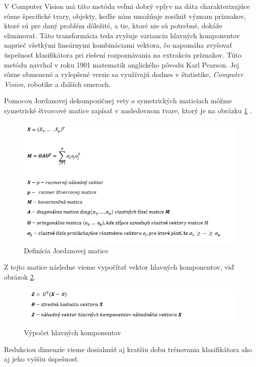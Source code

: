 V Computer Vision má táto metóda veľmi dobrý vplyv na dáta charakterizujúce rôzne špecifické tvary, objekty, keďže nám umožňuje zosilniť význam príznakov, ktoré sú pre daný problém dôležité, a tie, ktoré nie sú potrebné, dokáže eliminovať. Táto transformácia teda zvyšuje varianciu hlavných komponentov naprieč všetkými lineárnymi kombináciami vektora, čo napomáha zvyšovať úspešnosť klasifikátora pri riešení rozpoznávania na extrakciu príznakov. Túto metódu navrhol v roku 1901 matematik anglického pôvodu Karl Pearson. Jej rôzne obmenené a vylepšené verzie sa využívajú dodnes v štatistike, \textit{Computer Vision}, robotike a ďalších smeroch.

Pomocou Jordanovej dekompozičnej vety o symetrických maticiach môžme symetrické štvorcové matice zapísať v nasledovnom tvare, ktorý je na obrázku \ref{PCAJord} \cite{c15} \cite{c16}.
\begin{figure}[H]
  \centering
  \includegraphics[width=16cm]{img/PCAjordan.png}
  \caption{Definícia Jordanovej matice}
  \label{PCAJord}
\end{figure}

Z tejto matice následne vieme vypočítať vektor hlavných komponentov, viď obrázok \ref{PCAhlav}.

\begin{figure}[H]
  \centering
  \includegraphics[width=16cm]{img/PCAhlavnekomponenty.png}
  \caption{Výpočet hlavných komponentov}
  \label{PCAhlav}
\end{figure}
\cite{c17}

Redukciou dimenzie vieme dosiahnúť aj kratšiu dobu trénovania klasifikátora ako aj jeho vyššiu úspešnosť. 


